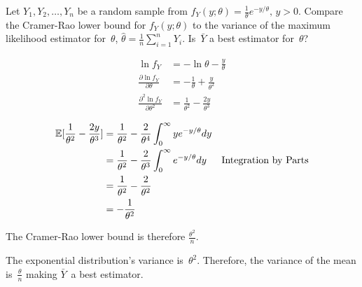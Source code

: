 \begin{problem}
  Let ${Y_1,Y_2,\ldots,Y_n}$ be a random sample from ${f_{Y}(y;\theta) = \frac{1}{\theta} e^{-y/\theta}\text{, } y > 0}$.  Compare the Cramer-Rao lower bound for ${f_{Y}(y;\theta)}$ to the variance of the maximum likelihood estimator for~$\theta$, ${\hat{\theta} = \frac{1}{n}\sum_{i=1}^{n}Y_i}$. Is~$\bar{Y}$ a best estimator for~$\theta$?
\end{problem}

\begin{align}
  \ln f_Y &= -\ln\theta - \frac{y}{\theta} \\
  \frac{\partial \ln f_Y}{\partial \theta} &= -\frac{1}{\theta} + \frac{y}{\theta^2} \\
  \frac{\partial^{2} \ln f_Y}{\partial \theta^{2}} &= \frac{1}{\theta^2} - \frac{2y}{\theta^3}
\end{align}

\begin{align}
  \mathbb{E}\lbrack\frac{1}{\theta^2} - \frac{2y}{\theta^3}\rbrack &= \frac{1}{\theta^2} - \frac{2}{\theta^4} \int_{0}^{\infty} ye^{-y/\theta} dy \\
                                                    &= \frac{1}{\theta^2} - \frac{2}{\theta^3} \int_{0}^{\infty} e^{-y/\theta} dy  & \text{Integration by Parts} \\
                                                    &= \frac{1}{\theta^2} - \frac{2}{\theta^2} \\
                                                    &= - \frac{1}{\theta^2}
\end{align}

The Cramer-Rao lower bound is therefore ${\boxed{\frac{\theta^2}{n}}}$.

The exponential distribution's variance is~$\theta^2$.  Therefore, the variance of the mean is~$\frac{\theta}{n}$ making $\bar{Y}$~a best estimator.
